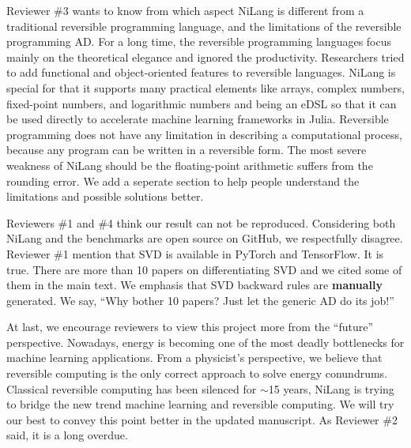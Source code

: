 \documentclass{article}
\begin{document}
Reviewer \#3 wants to know from which aspect NiLang is different from a traditional reversible programming language, and the limitations of the reversible programming AD.
For a long time, the reversible programming languages focus mainly on the theoretical elegance and ignored the productivity. Researchers tried to add functional and object-oriented features to reversible languages.
NiLang is special for that it supports many practical elements like arrays, complex numbers, fixed-point numbers, and logarithmic numbers and being an eDSL so that it can be used directly to accelerate machine learning frameworks in Julia.
Reversible programming does not have any limitation in describing a computational process, because any program can be written in a reversible form. The most severe weakness of NiLang should be the floating-point arithmetic suffers from the rounding error.
We add a seperate section to help people understand the limitations and possible solutions better.

Reviewers \#1 and \#4 think our result can not be reproduced. Considering both NiLang and the benchmarks are open source on GitHub, we respectfully disagree.
Reviewer \#1 mention that SVD is available in PyTorch and TensorFlow. It is true. There are more than 10 papers on differentiating SVD and we cited some of them in the main text. We emphasis that SVD backward rules are \textbf{manually} generated. We say, ``Why bother 10 papers? Just let the generic AD do its job!''

At last, we encourage reviewers to view this project more from the ``future'' perspective.
Nowadays, energy is becoming one of the most deadly bottlenecks for machine learning applications.
From a physicist's perspective, we believe that reversible computing is the only correct approach to solve energy conundrums.
Classical reversible computing has been silenced for $\sim$15 years, NiLang is trying to bridge the new trend machine learning and reversible computing.
We will try our best to convey this point better in the updated manuscript. As Reviewer \#2 said, it is a long overdue.
\end{document}
